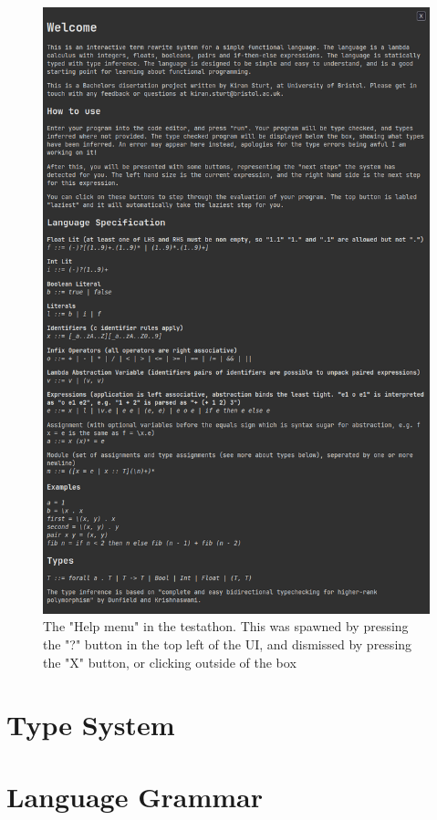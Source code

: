 \begin{figure}
    \centering
    \includegraphics[width=0.9\linewidth]{images/testathon_help_menu_cropped.png}
    \caption{The "Help menu" in the testathon. This was spawned by pressing the "?" button in the top left of the UI, and dismissed by pressing the "X" button, or clicking outside of the box}
    \label{fig:screenshot_testathon_2}
\end{figure}

\chapter{Type System}


\chapter{Language Grammar}
